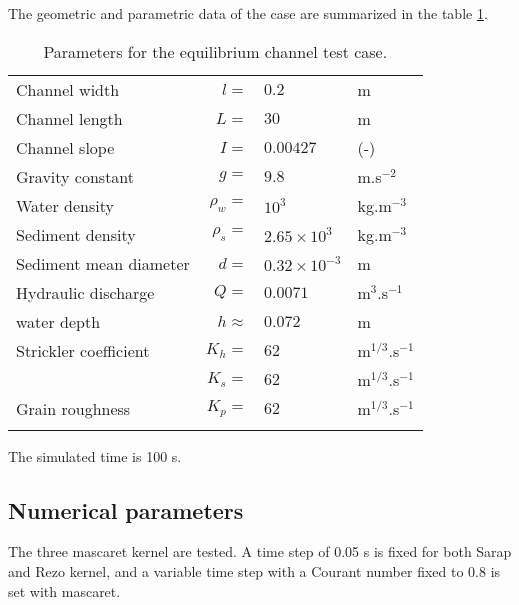 The geometric and parametric data of the case are summarized in the table \ref{paramCanEq}.

\begin{table}[h]
\begin{center}
\begin{tabular}{l r l l}
  \hline
  Channel width             & $l=$               &$0.2$                &m \\
  Channel length            & $L=$               &$30$                 &m \\
  Channel slope               & $I=$               &$0.00427$            &(-) \\
  \hline
  Gravity constant  & $g=$             &$9.8$                &m.s$^{-2}$ \\
  Water density             & $\rho_w=$          &$10^3$               &kg.m$^{-3}$ \\
  Sediment density          & $\rho_s=$          &$2.65\times10^3$     &kg.m$^{-3}$ \\
  Sediment mean diameter            & $d=$               &$0.32\times10^{-3}$  &m \\
  \hline
  \hline
  Hydraulic discharge            &$Q=$               &$0.0071$              &m$^3$.s$^{-1}$ \\
  water depth                &$h\approx$         &$0.072$               &m  \\
  \hline
  \hline
  Strickler coefficient & $K_h=$  & $62$  & m$^{1/3}$.s$^{-1}$ \\
                           & $K_s=$  & $62$  & m$^{1/3}$.s$^{-1}$ \\
  Grain roughness      & $K_p=$  & $62$  & m$^{1/3}$.s$^{-1}$ \\
  \hline
  \\
\end{tabular}
\caption{\label{paramCanEq}Parameters for the equilibrium channel test case.}
\end{center}
\end{table}

The simulated time is 100 s.

\subsection{Numerical parameters}

The three mascaret kernel are tested. A time step of 0.05 s is fixed
for both Sarap and Rezo kernel, and a variable time step with a 
Courant number fixed to 0.8 is set with mascaret.

